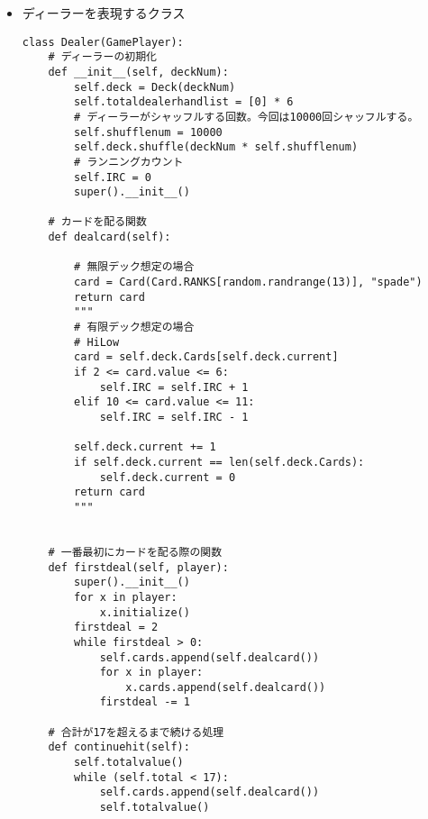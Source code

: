 \begin{itemize}
\item ディーラーを表現するクラス
\begin{lstlisting}
class Dealer(GamePlayer):
    # ディーラーの初期化
    def __init__(self, deckNum):
        self.deck = Deck(deckNum)
        self.totaldealerhandlist = [0] * 6
        # ディーラーがシャッフルする回数。今回は10000回シャッフルする。
        self.shufflenum = 10000
        self.deck.shuffle(deckNum * self.shufflenum)
        # ランニングカウント
        self.IRC = 0
        super().__init__()

    # カードを配る関数
    def dealcard(self):

        # 無限デック想定の場合
        card = Card(Card.RANKS[random.randrange(13)], "spade")
        return card
        """
        # 有限デック想定の場合
        # HiLow
        card = self.deck.Cards[self.deck.current]
        if 2 <= card.value <= 6:
            self.IRC = self.IRC + 1
        elif 10 <= card.value <= 11:
            self.IRC = self.IRC - 1

        self.deck.current += 1
        if self.deck.current == len(self.deck.Cards):
            self.deck.current = 0
        return card
        """


    # 一番最初にカードを配る際の関数
    def firstdeal(self, player):
        super().__init__()
        for x in player:
            x.initialize()
        firstdeal = 2
        while firstdeal > 0:
            self.cards.append(self.dealcard())
            for x in player:
                x.cards.append(self.dealcard())
            firstdeal -= 1

    # 合計が17を超えるまで続ける処理
    def continuehit(self):
        self.totalvalue()
        while (self.total < 17):
            self.cards.append(self.dealcard())
            self.totalvalue()


\end{lstlisting}
\end{itemize}
\newpage
